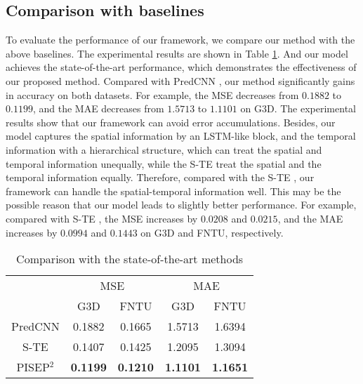 \documentclass[journal]{IEEEtran}
\begin{document}
\subsection{Comparison with baselines}
To evaluate the performance of our framework, we compare our method with the above baselines. The experimental results are shown in Table \ref{table1}. And our model achieves the state-of-the-art performance, which demonstrates the effectiveness of our proposed method. Compared with PredCNN \cite{predcnn}, our method significantly gains in accuracy on both datasets. For example, the MSE decreases from ${0.1882}$ to ${0.1199}$, and the MAE decreases from ${1.5713}$ to ${1.1101}$ on G${3}$D. The experimental results show that our framework can avoid error accumulations. Besides, our model captures the spatial information by an LSTM-like block, and the temporal information with a hierarchical structure, which can treat the spatial and temporal information unequally, while the S-TE \cite{ButepageDRL} treat the spatial and the temporal information equally. Therefore, compared with the S-TE \cite{ButepageDRL}, our framework can handle the spatial-temporal information well. This may be the possible reason that our model leads to slightly better performance. For example, compared with S-TE \cite{ButepageDRL}, the MSE increases by ${0.0208}$ and ${0.0215}$, and the MAE increases by ${0.0994}$ and ${0.1443}$ on G${3}$D and FNTU, respectively.

\begin{table}[!t]
\renewcommand{\arraystretch}{1.3}
\caption{Comparison with the state-of-the-art methods}
\label{table1}
\centering
\begin{tabular}{ccccc}
\hline
\multirow{2}{*}{}& \multicolumn{2}{c}{MSE} & \multicolumn{2}{c}{MAE} \\
\cline{2-5}& G3D &FNTU & G3D &FNTU \\
\hline
PredCNN\cite{predcnn}&0.1882&0.1665&1.5713&1.6394 \\
S-TE\cite{ButepageDRL}&0.1407&0.1425&1.2095&1.3094 \\
PISEP${^2}$&{\bf 0.1199}&{\bf 0.1210}&{\bf 1.1101}&{\bf 1.1651} \\
\hline
\end{tabular}
\end{table}
\end{document}
